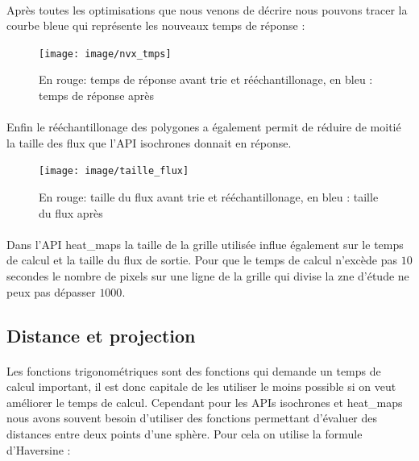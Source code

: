 \documentclass[a4paper]{report}
\begin{document}
\paragraph{} Après toutes les optimisations que nous venons de décrire nous pouvons tracer la courbe bleue qui représente les nouveaux temps de réponse :

\begin{figure}[H]
	\begin{center}
		\texttt{[image: image/nvx\_tmps]}
		\caption{En rouge: temps de réponse avant trie et rééchantillonage, en bleu : temps de réponse après}
		\label{Temps de réponse après tri et rééchantillonnage}
	\end{center}
\end{figure}

\paragraph{} Enfin le rééchantillonage des polygones a également permit de réduire de moitié la taille des flux que l'API isochrones donnait en réponse.

\begin{figure}[H]
	\begin{center}
		\texttt{[image: image/taille\_flux]}
		\caption{En rouge: taille du flux avant trie et rééchantillonage, en bleu : taille du flux après}
		\label{Taille du flux après tri et rééchantillonnage}
	\end{center}
\end{figure}

\paragraph{} Dans l'API heat\_maps la taille de la grille utilisée influe également sur le temps de calcul et la taille du flux de sortie. Pour que le temps de calcul n'excède pas $10$ secondes le nombre de pixels sur une ligne de la grille qui divise la zne d'étude ne peux pas dépasser $1000$.

\subsection{Distance et projection}

\paragraph{} Les fonctions trigonométriques sont des fonctions qui demande un temps de calcul important, il est donc capitale de les utiliser le moins possible si on veut améliorer le temps de calcul. Cependant pour les APIs isochrones et heat\_maps nous avons souvent besoin d'utiliser des fonctions permettant d'évaluer des distances entre deux points d'une sphère. Pour cela on utilise la formule d'Haversine :
\end{document}
